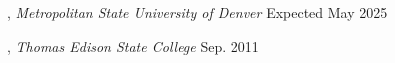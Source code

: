 
,
\textit{Metropolitan State University of Denver} \hfill	Expected May
2025

, \textit{Thomas Edison
	State College} \hfill	Sep. 2011

